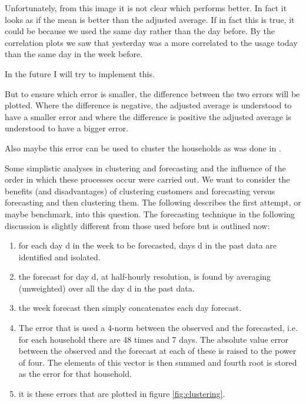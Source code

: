 \documentclass[a4paper]{article}
\begin{document}
Unfortunately, from this image it is not clear which performs better. In fact it looks as if the mean is better than the adjusted average. If in fact this is true, it could be because we used the same day rather than the day before. By the correlation plots we saw that yesterday was a more correlated to the usage today than the same day in the week before.

In the future I will try to implement this.

But to ensure which error is smaller, the difference between the two errors will be plotted. Where the difference is negative, the adjusted average is understood to have a smaller error and where the difference is positive the adjusted average is understood to have a bigger error.

Also maybe this error can be used to cluster the households as was done in \cite{Dan14}.


Some simplistic analyses in clustering and forecasting and the influence of the order in which these processes occur were carried out. We want to consider the benefits (and disadvantages) of clustering customers and forecasting versus forecasting and then clustering them. The following describes the first attempt, or maybe benchmark, into this question. \newline
The forecasting technique in the following discussion is slightly different from those used before but is outlined now:
\begin{enumerate}
\item for each day d in the week to be forecasted, days d in the past data are identified and isolated.
\item the forecast for day d, at half-hourly resolution, is found by averaging (unweighted) over all the day d in the past data.
\item the week forecast then simply concatenates each day forecast.
\item The error that is used a 4-norm between the observed and the forecasted, i.e. for each household there are 48 times and 7 days. The absolute value error between the observed and the forecast at each of these is raised to the power of four. The elements of this vector is then summed and fourth root is stored as the error for that household.
\item it is these errors that are plotted in figure \ref{fig:clustering}.
\end{enumerate}
\end{document}
